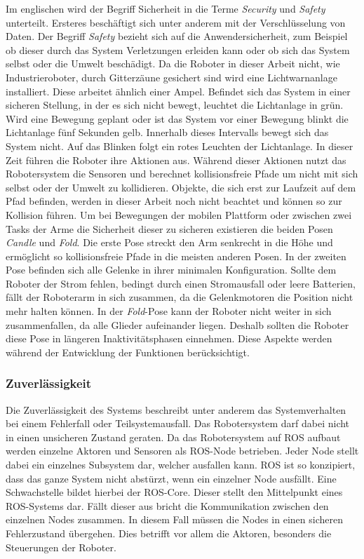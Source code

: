 Im englischen wird der Begriff Sicherheit in die Terme \textit{Security} und \textit{Safety} unterteilt. Ersteres beschäftigt sich unter anderem mit der Verschlüsselung von Daten. Der Begriff \textit{Safety} bezieht sich auf die Anwendersicherheit, zum Beispiel ob dieser durch das System Verletzungen erleiden kann oder ob sich das System selbst oder die Umwelt beschädigt. Da die Roboter in dieser Arbeit nicht, wie Industrieroboter, durch Gitterzäune gesichert sind wird eine Lichtwarnanlage installiert. Diese arbeitet ähnlich einer Ampel. Befindet sich das System in einer sicheren Stellung, in der es sich nicht bewegt, leuchtet die Lichtanlage in grün. Wird eine Bewegung geplant oder ist das System vor einer Bewegung blinkt die Lichtanlage fünf Sekunden gelb. Innerhalb dieses Intervalls bewegt sich das System nicht. Auf das Blinken folgt ein rotes Leuchten der Lichtanlage. In dieser Zeit führen die Roboter ihre Aktionen aus. Während dieser Aktionen nutzt das Robotersystem die Sensoren und berechnet kollisionsfreie Pfade um nicht mit sich selbst oder der Umwelt zu kollidieren. Objekte, die sich erst zur Laufzeit auf dem Pfad befinden, werden in dieser Arbeit noch nicht beachtet und können so zur Kollision führen. Um bei Bewegungen der mobilen Plattform oder zwischen zwei Tasks der Arme die Sicherheit dieser zu sicheren existieren die beiden Posen \textit{Candle} und \textit{Fold}. Die erste Pose streckt den Arm senkrecht in die Höhe und ermöglicht so kollisionsfreie Pfade in die meisten anderen Posen. In der zweiten Pose befinden sich alle Gelenke in ihrer minimalen Konfiguration. Sollte dem Roboter der Strom fehlen, bedingt durch einen Stromausfall oder leere Batterien, fällt der Roboterarm in sich zusammen, da die Gelenkmotoren die Position nicht mehr halten können. In der \textit{Fold}-Pose kann der Roboter nicht weiter in sich zusammenfallen, da alle Glieder aufeinander liegen. Deshalb sollten die Roboter diese Pose in längeren Inaktivitätsphasen einnehmen. Diese Aspekte werden während der Entwicklung der Funktionen berücksichtigt.

\subsubsection{Zuverlässigkeit}
Die Zuverlässigkeit des Systems beschreibt unter anderem das Systemverhalten bei einem Fehlerfall oder Teilsystemausfall. Das Robotersystem darf dabei nicht in einen unsicheren Zustand geraten. Da das Robotersystem auf ROS aufbaut werden einzelne Aktoren und Sensoren als ROS-Node betrieben. Jeder Node stellt dabei ein einzelnes Subsystem dar, welcher ausfallen kann. ROS ist so konzipiert, dass das ganze System nicht abstürzt, wenn ein einzelner Node ausfällt. Eine Schwachstelle bildet hierbei der ROS-Core. Dieser stellt den Mittelpunkt eines ROS-Systems dar. Fällt dieser aus bricht die Kommunikation zwischen den einzelnen Nodes zusammen. In diesem Fall müssen die Nodes in einen sicheren Fehlerzustand übergehen. Dies betrifft vor allem die Aktoren, besonders die Steuerungen der Roboter. 

